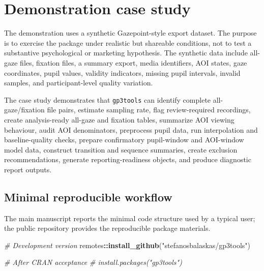 \documentclass[
]{article}
\newenvironment{Shaded}{\begin{snugshade}}{\end{snugshade}}
\newcommand{\CommentTok}[1]{\textcolor[rgb]{0.56,0.35,0.01}{\textit{#1}}}
\newcommand{\FunctionTok}[1]{\textcolor[rgb]{0.13,0.29,0.53}{\textbf{#1}}}
\newcommand{\NormalTok}[1]{#1}
\newcommand{\SpecialCharTok}[1]{\textcolor[rgb]{0.81,0.36,0.00}{\textbf{#1}}}
\newcommand{\StringTok}[1]{\textcolor[rgb]{0.31,0.60,0.02}{#1}}
\begin{document}
\section{Demonstration case study}\label{demonstration-case-study}

The demonstration uses a synthetic Gazepoint-style export dataset. The
purpose is to exercise the package under realistic but shareable
conditions, not to test a substantive psychological or marketing
hypothesis. The synthetic data include all-gaze files, fixation files, a
summary export, media identifiers, AOI states, gaze coordinates, pupil
values, validity indicators, missing pupil intervals, invalid samples,
and participant-level quality variation.

The case study demonstrates that \texttt{gp3tools} can identify complete
all-gaze/fixation file pairs, estimate sampling rate, flag
review-required recordings, create analysis-ready all-gaze and fixation
tables, summarize AOI viewing behaviour, audit AOI denominators,
preprocess pupil data, run interpolation and baseline-quality checks,
prepare confirmatory pupil-window and AOI-window model data, construct
transition and sequence summaries, create exclusion recommendations,
generate reporting-readiness objects, and produce diagnostic report
outputs.

\subsection{Minimal reproducible
workflow}\label{minimal-reproducible-workflow}

The main manuscript reports the minimal code structure used by a typical
user; the public repository provides the reproducible package materials.

\begin{Shaded}
\begin{Highlighting}[]
\CommentTok{\# Development version}
\NormalTok{remotes}\SpecialCharTok{::}\FunctionTok{install\_github}\NormalTok{(}\StringTok{"stefanosbalaskas/gp3tools"}\NormalTok{)}

\CommentTok{\# After CRAN acceptance}
\CommentTok{\# install.packages("gp3tools")}
\end{Highlighting}
\end{Shaded}
\end{document}
